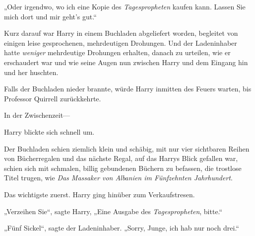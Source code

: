 „Oder irgendwo, wo ich eine Kopie des \emph{Tagespropheten} kaufen kann. Lassen Sie mich dort und mir geht’s gut.“

Kurz darauf war Harry in einem Buchladen abgeliefert worden, begleitet von einigen leise gesprochenen, mehrdeutigen Drohungen. Und der Ladeninhaber hatte \emph{weniger} mehrdeutige Drohungen erhalten, danach zu urteilen, wie er erschaudert war und wie seine Augen nun zwischen Harry und dem Eingang hin und her huschten.

Falls der Buchladen nieder brannte, würde Harry inmitten des Feuers warten, bis Professor Quirrell zurückkehrte.

In der Zwischenzeit—

Harry blickte sich schnell um.

Der Buchladen schien ziemlich klein und schäbig, mit nur vier sichtbaren Reihen von Bücherregalen und das nächste Regal, auf das Harrys Blick gefallen war, schien sich mit schmalen, billig gebundenen Büchern zu befassen, die trostlose Titel trugen, wie \emph{Das Massaker von Albanien im Fünfzehnten Jahrhundert}.%

Das wichtigste zuerst. Harry ging hinüber zum Verkaufstresen.

„Verzeihen Sie“, sagte Harry, „Eine Ausgabe des \emph{Tagespropheten}, bitte.“

„Fünf Sickel“, sagte der Ladeninhaber. „Sorry, Junge, ich hab nur noch drei.“

